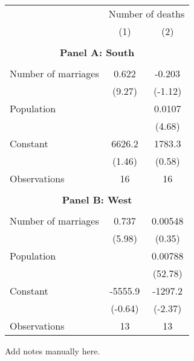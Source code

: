 \begin{tabular}{l*{2}{c}} \hline\hline
                    &\multicolumn{2}{c}{Number of deaths}       \\
                    &\multicolumn{1}{c}{(1)}         &\multicolumn{1}{c}{(2)}         \\
\hline \\ \multicolumn{3}{c}{\textbf{Panel A: South}} \\\\[-1ex]
Number of marriages &       0.622\sym{***}&      -0.203         \\
                    &      (9.27)         &     (-1.12)         \\
[1em]
Population          &                     &      0.0107\sym{***}\\
                    &                     &      (4.68)         \\
[1em]
Constant            &      6626.2         &      1783.3         \\
                    &      (1.46)         &      (0.58)         \\
\hline
Observations        &          16         &          16         \\
\hline \\ \multicolumn{3}{c}{\textbf{Panel B: West}} \\\\[-1ex]
Number of marriages &       0.737\sym{***}&     0.00548         \\
                    &      (5.98)         &      (0.35)         \\
[1em]
Population          &                     &     0.00788\sym{***}\\
                    &                     &     (52.78)         \\
[1em]
Constant            &     -5555.9         &     -1297.2\sym{*}  \\
                    &     (-0.64)         &     (-2.37)         \\
\hline
Observations        &          13         &          13         \\
\hline\hline \end{tabular} \begin{tablenotes} \footnotesize \item Add notes manually here. \end{tablenotes}
